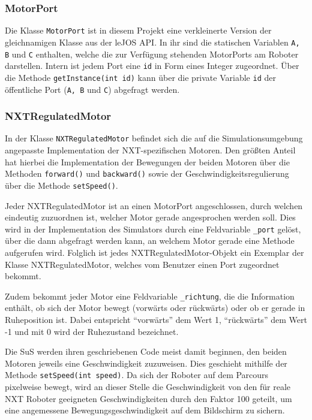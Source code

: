 \documentclass[paper=a4, DIV=calc, BCOR=12mm, twoside=on, onecolumn=on, open = right, titlepage =on, parskip =half-, headsepline = on, footsepline = off, chapterprefix = off, appendixprefix = on, fontsize = 12pt, numbers = noenddot, abstract = on]{scrbook}
\begin{document}
\subsubsection{MotorPort}
Die Klasse \texttt{MotorPort} ist in diesem Projekt eine verkleinerte Version der gleichnamigen Klasse aus der leJOS API. In ihr sind die statischen Variablen \texttt{A, B} und \texttt{C} enthalten, welche die zur Verfügung stehenden MotorPorts am Roboter darstellen. Intern ist jedem Port eine \texttt{id} in Form eines Integer zugeordnet. Über die Methode \texttt{get\-In\-stance(int id)} kann über die private Variable \texttt{id} der öffentliche Port (\texttt{A, B} und \texttt{C}) abgefragt werden.

\subsubsection{NXTRegulatedMotor}
In der Klasse \texttt{NXTRegulatedMotor} befindet sich die auf die Simulationsumgebung angepasste Implementation der NXT-spezifischen Motoren. Den größten Anteil hat hierbei die Implementation der Bewegungen der beiden Motoren über die Methoden \texttt{for\-ward()} und \texttt{back\-ward()} sowie der Geschwindigkeitsregulierung über die Methode \texttt{set\-Speed()}. 

Jeder NXTRegulatedMotor ist an einen MotorPort angeschlossen, durch welchen eindeutig zuzuordnen ist, welcher Motor gerade angesprochen werden soll. Dies wird in der Implementation des Simulators durch eine Feldvariable \texttt{{\_}port} gelöst, über die dann abgefragt werden kann, an welchem Motor gerade eine Methode aufgerufen wird. Folglich ist jedes NXT\-Regulated\-Motor\--Objekt ein Exemplar der Klasse NXTRegulatedMotor, welches vom Benutzer einen Port zugeordnet bekommt.

Zudem bekommt jeder Motor eine Feldvariable \texttt{{\_}richtung}, die die Information enthält, ob sich der Motor bewegt (vorwärts oder rückwärts) oder ob er gerade in Ruheposition ist. Dabei entspricht "`vorwärts"' dem Wert 1, "`rückwärts"' dem Wert -1 und mit 0 wird der Ruhezustand bezeichnet.

Die SuS werden ihren geschriebenen Code meist damit beginnen, den beiden Motoren jeweils eine Geschwindigkeit zuzuweisen. Dies geschieht mithilfe der Methode \texttt{setSpeed(int speed)}. Da sich der Roboter auf dem Parcours pixelweise bewegt, wird an dieser Stelle die Geschwindigkeit von den für reale NXT Roboter geeigneten Geschwindigkeiten durch den Faktor 100 geteilt, um eine angemessene Bewegungsgeschwindigkeit auf dem Bildschirm zu sichern.
\end{document}
